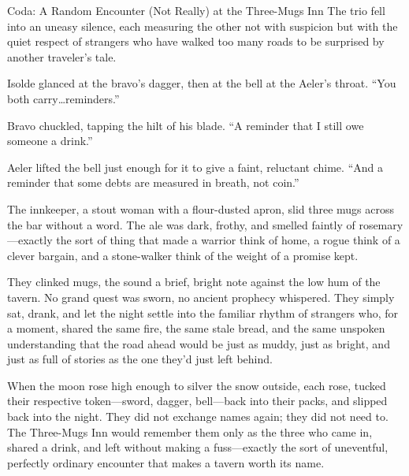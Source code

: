 \documentclass[12pt,oneside]{book}
\begin{document}
\begin{chapter*}{Coda: A Random Encounter (Not Really) at the Three-Mugs Inn}
The trio fell into an uneasy silence, each measuring the other not with suspicion but with the quiet respect of strangers who have walked too many roads to be surprised by another traveler's tale.

Isolde glanced at the bravo's dagger, then at the bell at the Aeler's throat. ``You both carry\dots reminders.''

Bravo chuckled, tapping the hilt of his blade. ``A reminder that I still owe someone a drink.''

Aeler lifted the bell just enough for it to give a faint, reluctant chime. ``And a reminder that some debts are measured in breath, not coin.''

The innkeeper, a stout woman with a flour-dusted apron, slid three mugs across the bar without a word. The ale was dark, frothy, and smelled faintly of rosemary---exactly the sort of thing that made a warrior think of home, a rogue think of a clever bargain, and a stone-walker think of the weight of a promise kept.

They clinked mugs, the sound a brief, bright note against the low hum of the tavern. No grand quest was sworn, no ancient prophecy whispered. They simply sat, drank, and let the night settle into the familiar rhythm of strangers who, for a moment, shared the same fire, the same stale bread, and the same unspoken understanding that the road ahead would be just as muddy, just as bright, and just as full of stories as the one they'd just left behind.

When the moon rose high enough to silver the snow outside, each rose, tucked their respective token---sword, dagger, bell---back into their packs, and slipped back into the night. They did not exchange names again; they did not need to. The Three-Mugs Inn would remember them only as the three who came in, shared a drink, and left without making a fuss---exactly the sort of uneventful, perfectly ordinary encounter that makes a tavern worth its name.

\end{chapter*}

\printindex
\end{document}
